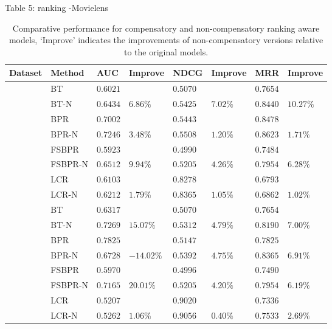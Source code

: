 \documentclass[letterpaper]{article} %
\begin{document}
Table 5: ranking -Movielens
\begin{table}[htp]
\tiny
\caption{Comparative performance for compensatory and non-compensatory ranking aware models, `Improve' indicates the improvements of non-compensatory versions relative to the original models.}
\begin{center}
\begin{tabular}{p{0.4cm}<{\centering}|p{1.2cm}<{\centering} |p{0.5cm} p{0.6cm} |p{0.5cm} p{0.6cm} |p{0.5cm} p{0.6cm}}
\hline
Dataset	& Method	& AUC	& Improve&	NDCG&	Improve&	MRR	&Improve\\\hline
{} &	BT	& $0.6021$ 	& &	$0.5070$ 	&&	$0.7654$ 	&\\
	&BT-N	&$0.6434$ &	$6.86\%$	&$0.5425 $	&$7.02\%$	&$0.8440$ &	$10.27\%$	\\
	&BPR&	$0.7002$ 	&&	$0.5443$ 	&&	$0.8478$ &\\
	&BPR-N	&$0.7246$ 	&$3.48\%$	&$0.5508$ &	$1.20\%$	&$0.8623$ 	&$1.71\%$	\\
	&FSBPR		&$0.5923$&	&$0.4990$ 	&&	$0.7484$&\\	
	&FSBPR-N	&$0.6512$	&$9.94\%$	&	$0.5205$ 	&$4.26\%$	&$0.7954$ 	&$6.28\%$	\\
	&LCR		&$0.6103$&	&$0.8278$ 	&&	$0.6793$&\\	
	&LCR-N	&$0.6212$	&$1.79\%$	&	$0.8365$ 	&$1.05\%$	&$0.6862$ 	&$1.02\%$ \\

	\hline
{}	&	BT	& $0.6317 $ 	& &	$0.5070$ 	&&	$0.7654$ 	&\\
	&BT-N	&$0.7269$ &	$15.07\%$	&$0.5312 $	&$4.79\%$	&$0.8190$ &	$7.00\%$	\\
	&BPR&	$0.7825$ 	&&	$0.5147$ 	&&	$0.7825$ &\\
	&BPR-N	&$0.6728$ 	&$-14.02\%$	&$0.5392$ &	$4.75\%$	&$0.8365$ 	&$6.91\%$	\\
	&FSBPR		&$0.5970$&	&$0.4996$ 	&&	$0.7490$&\\	
	&FSBPR-N	&$0.7165$	&$20.01\%$	&	$0.5205$ 	&$4.20\%$	&$0.7954$ 	&$6.19\%$	\\
	&LCR		&$0.5207$&	&$0.9020$ 	&&	$0.7336$&\\	
	&LCR-N	&$0.5262$	&$1.06\%$	&	$0.9056$ 	&$0.40\%$	&$0.7533$ 	&$2.69\%$ \\


\end{tabular}
\end{center}
\end{table}
\end{document}
